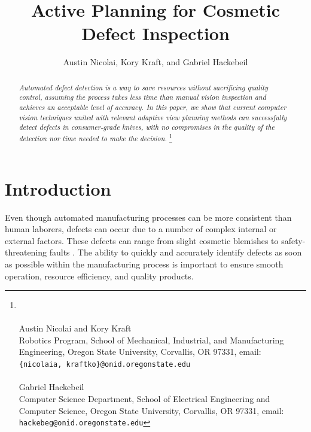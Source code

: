 \documentclass[letterpaper, 10 pt, conference]{ieeeconf}  %
\title{\LARGE \bf 
Active Planning for Cosmetic Defect Inspection
}
\author{Austin Nicolai, Kory Kraft, and Gabriel Hackebeil}
\begin{document}
\maketitle
\thispagestyle{empty}
\pagestyle{empty}

\begin{abstract}
\textit{Automated defect detection is a way to save resources without sacrificing quality control, assuming the process takes less time than manual vision inspection and achieves an acceptable level of accuracy. In this paper, we show that current computer vision techniques united with relevant adaptive view planning methods can successfully detect defects in consumer-grade knives, with no compromises in the quality of the detection nor time needed to make the decision.}
\let\thefootnote\relax\footnote{\hrulefill
\\\hspace*{1em} \hfill
\\\hspace*{1em} Austin Nicolai and Kory Kraft
\\\hspace*{1em} Robotics Program, School of Mechanical, Industrial, and Manufacturing
\\\hspace*{1em} Engineering, Oregon State University, Corvallis, OR 97331, email: 
\\\hspace*{1em} {\tt\small \{nicolaia, kraftko\}@onid.oregonstate.edu}
\\\hspace*{1em} \hfill
\\\hspace*{1em} Gabriel Hackebeil
\\\hspace*{1em} Computer Science Department, School of Electrical Engineering and
\\\hspace*{1em} Computer Science, Oregon State University, Corvallis, OR 97331, email: 
\\\hspace*{1em} {\tt\small hackebeg@onid.oregonstate.edu}
}
\end{abstract}


\section{Introduction}

Even though automated manufacturing processes can be more consistent than human laborers, defects can occur due to a number of complex internal or external factors. These defects can range from slight cosmetic blemishes to safety-threatening faults \cite{matScience}. The ability to quickly and accurately identify defects as soon as possible within the manufacturing process is important to ensure smooth operation, resource efficiency, and quality products. 
\end{document}
